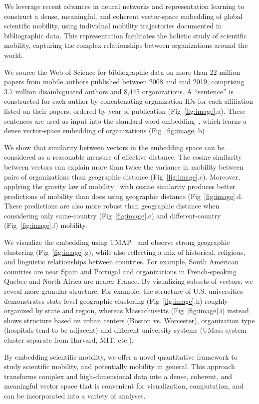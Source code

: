 \documentclass[a4paper,12pt]{article}
\begin{document}
We leverage recent advances in neural networks and representation learning to construct a dense, meaningful, and coherent vector-space embedding of global scientific mobility, using individual mobility trajectories documented in bibliographic data. 
This representation facilitates the holistic study of scientific mobility, capturing the complex relationships between organizations around the world. 

We source the Web of Science for bibliographic data on more than 22 million papers from mobile authors published between 2008 and mid 2019, comprising 3.7 million disambiguated authors and 8,445 organizations. 
A ``sentence'' is constructed for each author by concatenating organization IDs for each affiliation listed on their papers, ordered by year of publication (Fig~\ref{fig:image}.a).
These sentences are used as input into the standard word embedding~\autocite{mikolov_distributed_2013}, which learns a dense vector-space embedding of organizations (Fig~\ref{fig:image}.b) 

We show that similarity between vectors in the embedding space can be considered as a reasonable measure of effective distance. 
The cosine similarity between vectors can explain more than twice the variance in mobility between pairs of organizations than geographic distance (Fig~\ref{fig:image}.c). 
Moreover, applying the gravity law of mobility~\autocite{simini_universal_2012} with cosine similarity produces better predictions of mobility than does using geographic distance (Fig~\ref{fig:image}.d.
These predictions are also more robust than geographic distance when considering only same-country (Fig~\ref{fig:image}.e) and different-country (Fig~\ref{fig:image}.f) mobility. 

We visualize the embedding using UMAP~\autocite{mcinnes_umap_2018} and observe strong geographic clustering (Fig~\ref{fig:image}.g), while also reflecting a mix of historical, religious, and linguistic relationships between countries. 
For example, South American countries are near Spain and Portugal and organizations in French-speaking Quebec and North Africa are nearer France. 
By visualizing subsets of vectors, we reveal more granular structure.
For example, the structure of U.S. universities demonstrates state-level geographic clustering (Fig~\ref{fig:image}.h) roughly organized by state and region, whereas Massachusetts (Fig~\ref{fig:image}.i) instead shows structure based on urban centers (Boston vs. Worcester), organization type (hospitals tend to be adjacent) and different university systems (UMass system cluster separate from Harvard, MIT, etc.).

By embedding scientific mobility, we offer a novel quantitative framework to study scientific mobility, and potentially mobility in general. 
This approach transforms complex and high-dimensional data into a dense, coherent, and meaningful vector space that is convenient for visualization, computation, and can be incorporated into a variety of analyses.



%
%
%
\begingroup
{}
\small
\setlength\bibitemsep{1pt}
{\renewcommand{\markboth}[2]{}%
\printbibliography}
\endgroup
\end{document}
